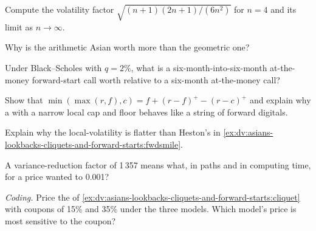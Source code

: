 \begin{exercise}[$\star$]\label{exo:dv:asians-lookbacks-cliquets-and-forward-starts:1}
Compute the volatility factor $\sqrt{(n+1)(2n+1)/(6n^2)}$ for $n=4$ and its limit as $n\to\infty$.
\end{exercise}

\begin{exercise}[$\star$]\label{exo:dv:asians-lookbacks-cliquets-and-forward-starts:2}
Why is the arithmetic Asian worth more than the geometric one?
\end{exercise}

\begin{exercise}[$\star$]\label{exo:dv:asians-lookbacks-cliquets-and-forward-starts:3}
Under Black--Scholes with $q=2\%$, what is a six-month-into-six-month at-the-money forward-start call worth relative to a
six-month at-the-money call?
\end{exercise}

\begin{exercise}[$\star\star$]\label{exo:dv:asians-lookbacks-cliquets-and-forward-starts:4}
Show that $\min(\max(r,f),c)=f+(r-f)^+-(r-c)^+$ and explain why a  with a narrow local cap and floor behaves like a
string of forward digitals.
\end{exercise}

\begin{exercise}[$\star\star$]\label{exo:dv:asians-lookbacks-cliquets-and-forward-starts:5}
Explain why the local-volatility  is flatter than Heston's in
\cref{ex:dv:asians-lookbacks-cliquets-and-forward-starts:fwdsmile}.
\end{exercise}

\begin{exercise}[$\star\star$]\label{exo:dv:asians-lookbacks-cliquets-and-forward-starts:6}
A variance-reduction factor of 1\,357 means what, in paths and in computing time, for a price wanted to 0.001?
\end{exercise}

\begin{exercise}[$\star\star\star$]\label{exo:dv:asians-lookbacks-cliquets-and-forward-starts:7}
\emph{Coding.} Price the  of \cref{ex:dv:asians-lookbacks-cliquets-and-forward-starts:cliquet} with coupons of
15\% and 35\% under the three models. Which model's price is most sensitive to the coupon?
\end{exercise}

